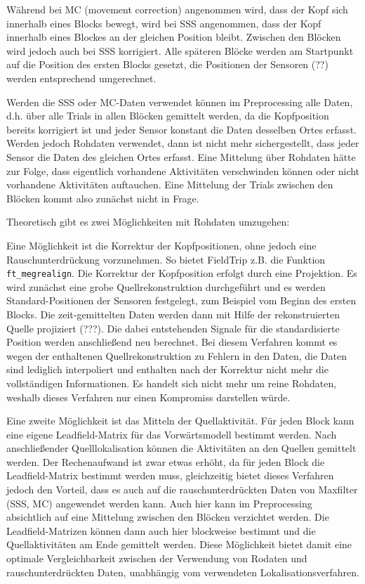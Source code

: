 \documentclass[doc,a4paper,12pt]{apa6}
\begin{document}
Während bei MC (movement correction) angenommen wird, dass der Kopf sich innerhalb eines Blocks bewegt, wird bei SSS angenommen, dass der Kopf innerhalb eines Blockes an der gleichen Position bleibt. Zwischen den Blöcken wird jedoch auch bei SSS korrigiert. Alle späteren Blöcke werden am Startpunkt auf die Position des ersten Blocks gesetzt, die Positionen der Sensoren (??) werden entsprechend umgerechnet.

Werden die SSS oder MC-Daten verwendet können im Preprocessing alle Daten, d.h. über alle Trials in allen Blöcken gemittelt werden, da die Kopfposition bereits korrigiert ist und jeder Sensor konstant die Daten desselben Ortes erfasst. Werden jedoch Rohdaten verwendet, dann ist nicht mehr sichergestellt, dass jeder Sensor die Daten des gleichen Ortes erfasst. Eine Mittelung über Rohdaten hätte zur Folge, dass eigentlich vorhandene Aktivitäten verschwinden können oder nicht vorhandene Aktivitäten auftauchen. Eine Mittelung der Trials zwischen den Blöcken kommt also zunächst nicht in Frage.

Theoretisch gibt es zwei Möglichkeiten mit Rohdaten umzugehen:

Eine Möglichkeit ist die Korrektur der Kopfpositionen, ohne jedoch eine Rauschunterdrückung vorzunehmen. So bietet FieldTrip z.B. die Funktion \texttt{ft\_megrealign}. Die Korrektur der Kopfposition erfolgt durch eine Projektion. Es wird zunächst eine grobe Quellrekonstruktion durchgeführt und es werden Standard-Positionen der Sensoren festgelegt, zum Beispiel vom Beginn des ersten Blocks. Die zeit-gemittelten Daten werden dann mit Hilfe der rekonstruierten Quelle projiziert (???). Die dabei entstehenden Signale für die standardisierte Position werden anschließend neu berechnet. Bei diesem Verfahren kommt es wegen der enthaltenen Quellrekonstruktion zu Fehlern in den Daten, die Daten sind lediglich interpoliert und enthalten nach der Korrektur nicht mehr die vollständigen Informationen. Es handelt sich nicht mehr um reine Rohdaten, weshalb dieses Verfahren nur einen Kompromiss darstellen würde.

Eine zweite Möglichkeit ist das Mitteln der Quellaktivität. Für jeden Block kann eine eigene Leadfield-Matrix für das Vorwärtsmodell bestimmt werden. Nach anschließender Quelllokalisation können die Aktivitäten an den Quellen gemittelt werden. Der Rechenaufwand ist zwar etwas erhöht, da für jeden Block die Leadfield-Matrix bestimmt werden muss, gleichzeitig bietet dieses Verfahren jedoch den Vorteil, dass es auch auf die rauschunterdrückten Daten von Maxfilter (SSS, MC) angewendet werden kann. Auch hier kann im Preprocessing absichtlich auf eine Mittelung zwischen den Blöcken verzichtet werden. Die Leadfield-Matrizen können dann auch hier blockweise bestimmt und die Quellaktivitäten am Ende gemittelt werden. Diese Möglichkeit bietet damit eine optimale Vergleichbarkeit zwischen der Verwendung von Rodaten und rauschunterdrückten Daten, unabhängig vom verwendeten Lokalisationsverfahren.
\end{document}
